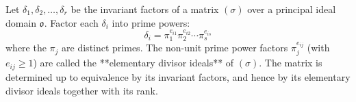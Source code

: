 Let $\delta_1, \delta_2, \ldots, \delta_r$ be the invariant factors of a matrix $(\sigma)$ over a principal ideal domain $\mathfrak{o}$. Factor each $\delta_i$ into prime powers:
$$\delta_i = \pi_1^{e_{i1}} \pi_2^{e_{i2}} \cdots \pi_s^{e_{is}}$$
where the $\pi_j$ are distinct primes. The non-unit prime power factors $\pi_j^{e_{ij}}$ (with $e_{ij} \geq 1$) are called the **elementary divisor ideals** of $(\sigma)$. The matrix is determined up to equivalence by its invariant factors, and hence by its elementary divisor ideals together with its rank.
